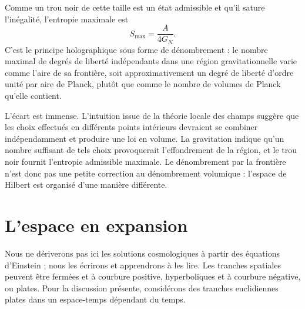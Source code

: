 Comme un trou noir de cette taille est un état admissible et qu’il sature l’inégalité, l’entropie maximale est
\begin{equation}
S_{\max}=\frac{A}{4G_N}.
\label{eq:l07-holographic-maximum}
\end{equation}
C’est le principe holographique sous forme de dénombrement : le nombre maximal de degrés de liberté indépendants dans une région gravitationnelle varie comme l’aire de sa frontière, soit approximativement un degré de liberté d’ordre unité par aire de Planck, plutôt que comme le nombre de volumes de Planck qu’elle contient.

L’écart est immense. L’intuition issue de la théorie locale des champs suggère que les choix effectués en différents points intérieurs devraient se combiner indépendamment et produire une loi en volume. La gravitation indique qu’un nombre suffisant de tels choix provoquerait l’effondrement de la région, et le trou noir fournit l’entropie admissible maximale. Le dénombrement par la frontière n’est donc pas une petite correction au dénombrement volumique : l’espace de Hilbert est organisé d’une manière différente.

\begin{classroomqa}
\end{classroomqa}

\begin{classroomqa}
\end{classroomqa}

\section{L’espace en expansion}

Nous ne dériverons pas ici les solutions cosmologiques à partir des équations d’Einstein ; nous les écrirons et apprendrons à les lire. Les tranches spatiales peuvent être fermées et à courbure positive, hyperboliques et à courbure négative, ou plates. Pour la discussion présente, considérons des tranches euclidiennes plates dans un espace-temps dépendant du temps.

